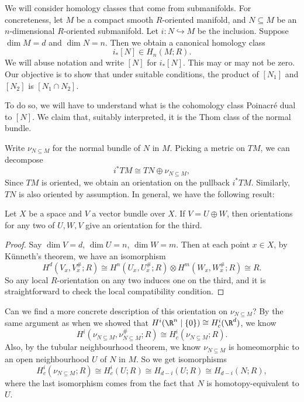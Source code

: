 \documentclass[a4paper]{article}
\theoremstyle{definition}
\begin{document}
We will consider homology classes that come from submanifolds. For concreteness, let $M$ be a compact smooth $R$-oriented manifold, and $N \subseteq M$ be an $n$-dimensional $R$-oriented submanifold. Let $i: N \hookrightarrow M$ be the inclusion. Suppose $\dim M = d$ and $\dim N = n$. Then we obtain a canonical homology class
\[
  i_*[N] \in H_n(M; R).
\]
We will abuse notation and write $[N]$ for $i_* [N]$. This may or may not be zero. Our objective is to show that under suitable conditions, the product of $[N_1]$ and $[N_2]$ is $[N_1 \cap N_2]$.

To do so, we will have to understand what is the cohomology class Poinacr\'e dual to $[N]$. We claim that, suitably interpreted, it is the Thom class of the normal bundle.

Write $\nu_{N \subseteq M}$ for the normal bundle of $N$ in $M$. Picking a metric on $TM$, we can decompose
\[
  i^*TM \cong TN \oplus \nu_{N \subseteq M},
\]
Since $TM$ is oriented, we obtain an orientation on the pullback $i^*TM$. Similarly, $TN$ is also oriented by assumption. In general, we have the following result:
\begin{lemma}
  Let $X$ be a space and $V$ a vector bundle over $X$. If $V = U \oplus W$, then orientations for any two of $U, W, V$ give an orientation for the third.
\end{lemma}

\begin{proof}
  Say $\dim V = d$, $\dim U = n$, $\dim W = m$. Then at each point $x \in X$, by K\"unneth's theorem, we have an isomorphism
  \[
    H^d(V_x, V_x^\#; R) \cong H^n(U_x, U_x^\#; R) \otimes H^m(W_x, W_x^\#; R) \cong R.
  \]
  So any local $R$-orientation on any two induces one on the third, and it is straightforward to check the local compatibility condition.
\end{proof}

Can we find a more concrete description of this orientation on $\nu_{N \subseteq M}$? By the same argument as when we showed that $H^i(\R^n \mid \{0\}) \cong H_c^i(\R^d)$, we know
\[
  H^i(\nu_{N \subseteq M}, \nu_{N \subseteq M}^\#; R) \cong H_c^i(\nu_{N \subseteq M}; R).
\]
Also, by the tubular neighbourhood theorem, we know $\nu_{N \subseteq M}$ is homeomorphic to an open neighbourhood $U$ of $N$ in $M$. So we get isomorphisms
\[
  H^i_c(\nu_{N \subseteq M}; R) \cong H_c^i(U; R) \cong H_{d - i}(U; R) \cong H_{d - i}(N; R),
\]
where the last isomorphism comes from the fact that $N$ is homotopy-equivalent to $U$.
\end{document}
